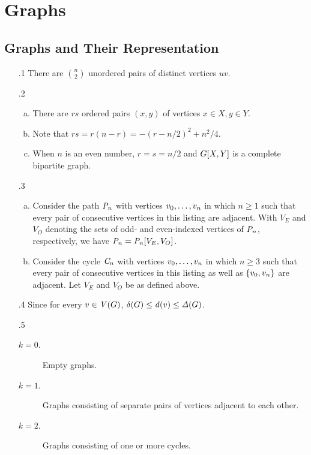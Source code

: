 \chapter{Graphs}
\section{Graphs and Their Representation}
\begin{enumerate}[1.]
%
\item[\thesection.1] There are ${n \choose 2}$ unordered pairs of distinct vertices $uv$.
%
\item[\thesection.2]
\begin{enumerate}[a)]
\item There are $rs$ ordered pairs $(x, y)$ of vertices $x \in X, y \in Y$.
\item Note that $rs = r(n - r) = -(r - n / 2)^2 + n^2 / 4$.
\item When $n$ is an even number, $r = s = n / 2$ and $G[X, Y]$ is a complete bipartite graph.
\end{enumerate}
%
\item[\thesection.3]
\begin{enumerate}[a)]
\item Consider the path $\path[n]$ with vertices $v_0, \ldots, v_n$ in which $n \geq 1$ such that every pair of consecutive vertices in this listing are adjacent. With $V_E$ and $V_O$ denoting the sets of odd- and even-indexed vertices of $\path[n]$, respectively, we have $\path[n] = \bipartite{\path[n]}{V_E, V_O}$.
\item Consider the cycle $\cycle[n]$ with vertices $v_0, \ldots, v_n$ in which $n \geq 3$ such that every pair of consecutive vertices in this listing as well as $\{v_0, v_n\}$ are adjacent. Let $V_E$ and $V_O$ be as defined above.
\end{enumerate}
%
\item[\thesection.4] Since for every $v \in \mathit{V}(G)$, $\mathit{\delta}(G) \leq \mathit{d}(v) \leq \mathit{\Delta}(G)$.
%
\item[\thesection.5]
\begin{description}
\item[$k = 0$.] Empty graphs.
\item[$k = 1$.] Graphs consisting of separate pairs of vertices adjacent to each other.
\item[$k = 2$.] Graphs consisting of one or more cycles.

\end{description}
\end{enumerate}
